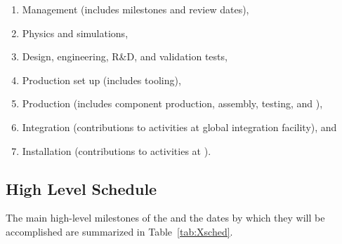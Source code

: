 \begin{enumerate}
\item Management \dual {} (includes milestones and review dates),
\item Physics and simulations,
\item Design, engineering, R\&D, and validation tests,
\item Production set up (includes tooling),
\item Production (includes component production, assembly, testing, and ),
\item Integration (contributions to activities at global integration facility), and
\item Installation (contributions to activities at \surf).

\end{enumerate}

\subsection{High Level Schedule}


The main high-level milestones of the \dual {} and the dates by which they will be accomplished are summarized in Table~\ref{tab:Xsched}.

